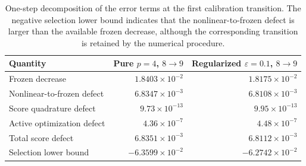 \begin{table}[!htbp]
\centering
\scriptsize
\caption{One-step decomposition of the error terms at the first calibration transition. The negative selection lower bound indicates that the nonlinear-to-frozen defect is larger than the available frozen decrease, although the corresponding transition is retained by the numerical procedure.}
\label{tab:transfer-margin-example}
\begin{tabularx}{\linewidth}{@{}Xrr@{}}
\toprule
Quantity & Pure \(p=4\), \(8\to9\) & Regularized \(\varepsilon=0.1\), \(8\to9\) \\
\midrule
Frozen decrease & \(1.8403\times10^{-2}\) & \(1.8175\times10^{-2}\) \\
Nonlinear-to-frozen defect & \(6.8347\times10^{-3}\) & \(6.8108\times10^{-3}\) \\
Score quadrature defect & \(9.73\times10^{-13}\) & \(9.95\times10^{-13}\) \\
Active optimization defect & \(4.36\times10^{-7}\) & \(4.48\times10^{-7}\) \\
Total score defect & \(6.8351\times10^{-3}\) & \(6.8112\times10^{-3}\) \\
Selection lower bound & \(-6.3599\times10^{-2}\) & \(-6.2742\times10^{-2}\) \\
\bottomrule
\end{tabularx}
\end{table}
